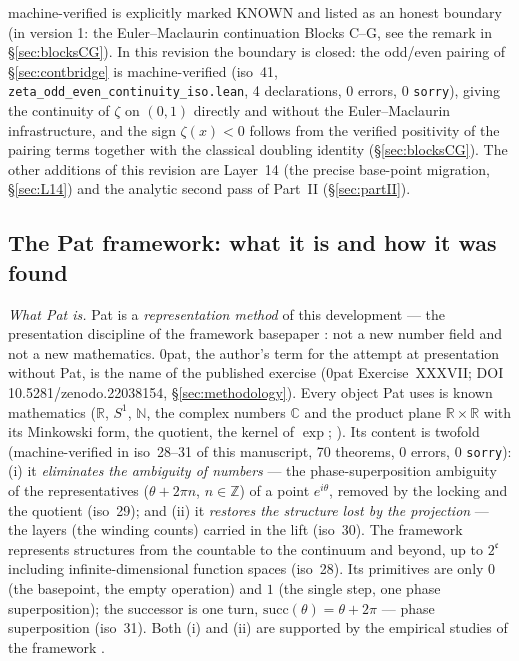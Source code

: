 \documentclass{article}
\newcommand{\zt}{\zeta}
\begin{document}
machine-verified is explicitly marked KNOWN and listed as an honest boundary
(in version 1: the Euler--Maclaurin continuation Blocks C--G, see the
remark in \S\ref{sec:blocksCG}). In this revision the boundary is closed: the odd/even
pairing of \S\ref{sec:contbridge} is machine-verified (iso~41,
\texttt{zeta\_odd\_even\_continuity\_iso.lean}, 4 declarations, 0 errors,
0 \texttt{sorry}), giving the continuity of $\zt$ on $(0,1)$ directly and
without the Euler--Maclaurin infrastructure, and the sign $\zt(x)<0$ follows
from the verified positivity of the pairing terms together with the
classical doubling identity (\S\ref{sec:blocksCG}). The other additions of
this revision are Layer~14 (the precise base-point migration,
\S\ref{sec:L14}) and the analytic second pass of Part~II
(\S\ref{sec:partII}).

\subsection{The Pat framework: what it is and how it was found}
\label{sec:pat}

\emph{What Pat is.} Pat is a \emph{representation method} of this
development --- the presentation discipline of the framework basepaper
\cite{patbase}: not a new
number field and not a new mathematics. 0pat, the author's term for the
attempt at presentation without Pat, is the name of the published
exercise (0pat Exercise~XXXVII; DOI 10.5281/zenodo.22038154,
\S\ref{sec:methodology}). Every object Pat uses is known
mathematics ($\mathbb R$, $S^1$, $\mathbb N$, the complex numbers
$\mathbb C$ and the product plane $\mathbb R\times\mathbb R$ with its
Minkowski form, the quotient, the kernel
of $\exp$; \cite{hatcher,halmos}). Its content is twofold
(machine-verified in iso~28--31 of this manuscript, 70 theorems, 0
errors, 0 \texttt{sorry}): (i) it \emph{eliminates the ambiguity of
numbers} --- the phase-superposition ambiguity of the representatives
($\theta+2\pi n$, $n\in\mathbb Z$) of a point $e^{i\theta}$, removed by
the locking and the quotient (iso~29); and (ii) it \emph{restores the
structure lost by the projection} --- the layers (the winding counts)
carried in the lift (iso~30). The framework represents structures from
the countable to the continuum and beyond, up to $2^{\mathfrak c}$
including infinite-dimensional function spaces (iso~28). Its primitives
are only $0$ (the basepoint, the empty operation) and $1$ (the single
step, one phase superposition); the successor is one turn,
$\mathrm{succ}(\theta)=\theta+2\pi$ --- phase superposition (iso~31).
Both (i) and (ii) are supported by the empirical studies of the
framework \cite{patbase}.
\end{document}
